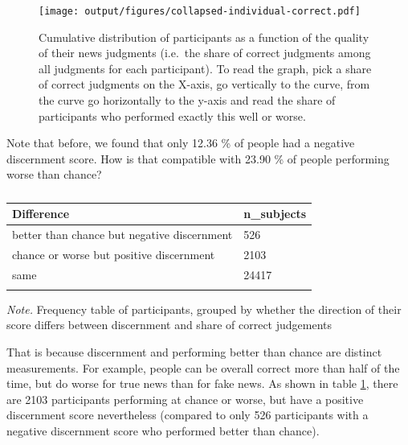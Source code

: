 \documentclass[
  man]{apa6}
\begin{document}
\begin{figure}
\centering
\texttt{[image: output/figures/collapsed-individual-correct.pdf]}
\caption{\label{fig:collapsed-individual-correct}Cumulative distribution of participants as a function of the quality of their news judgments (i.e.~the share of correct judgments among all judgments for each participant). To read the graph, pick a share of correct judgments on the X-axis, go vertically to the curve, from the curve go horizontally to the y-axis and read the share of participants who performed exactly this well or worse.}
\end{figure}

Note that before, we found that only 12.36 \% of people had a negative discernment score. How is that compatible with 23.90 \% of people performing worse than chance?

\begin{table}[tbp]

\begin{center}
\begin{threeparttable}

\caption{\label{tab:compare-individual-measures}}

\begin{tabular}{ll}
\toprule
Difference & \multicolumn{1}{c}{n\_subjects}\\
\midrule
better than chance but negative discernment & 526\\
chance or worse but positive discernment & 2103\\
same & 24417\\
\bottomrule
\addlinespace
\end{tabular}

\begin{tablenotes}[para]
\normalsize{\textit{Note.} Frequency table of participants, grouped by whether the direction of their score differs between discernment and share of correct judgements}
\end{tablenotes}

\end{threeparttable}
\end{center}

\end{table}

That is because discernment and performing better than chance are distinct measurements. For example, people can be overall correct more than half of the time, but do worse for true news than for fake news. As shown in table \ref{tab:compare-individual-measures}, there are 2103 participants performing at chance or worse, but have a positive discernment score nevertheless (compared to only 526 participants with a negative discernment score who performed better than chance).
\end{document}
